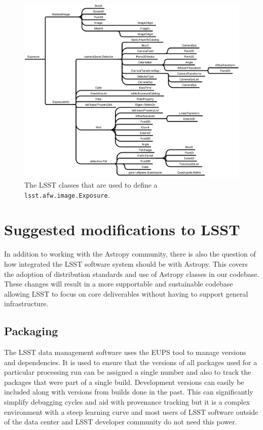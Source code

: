 \documentclass[]{spie}  %
\begin{document}
\begin{figure} [t]
\begin{center}
\includegraphics[width=\textwidth]{exposure-dependencies}
\end{center}
\caption[layers]
{\label{fig:exposure}
The LSST classes that are used to define a \texttt{lsst.afw.image.Exposure}.}
\end{figure}

\section{Suggested modifications to LSST}

In addition to working with the Astropy community, there is also the question of how integrated the LSST software system should be with Astropy.
This covers the adoption of distribution standards and use of Astropy classes in our codebase.
These changes will result in a more supportable and sustainable codebase allowing LSST to focus on core deliverables without having to support general infrastructure.

\subsection{Packaging}

The LSST data management software uses the EUPS tool\cite{EUPS} to manage versions and dependencies.
It is used to ensure that the versions of all packages used for a particular processing run can be assigned a single number and also to track the packages that were part of a single build.
Development versions can easily be included along with versions from builds done in the past.
This can significantly simplify debugging cycles and aid with provenance tracking but it is a complex environment with a steep learning curve and most users of LSST software outside of the data center and LSST developer community do not need this power.
\end{document}
